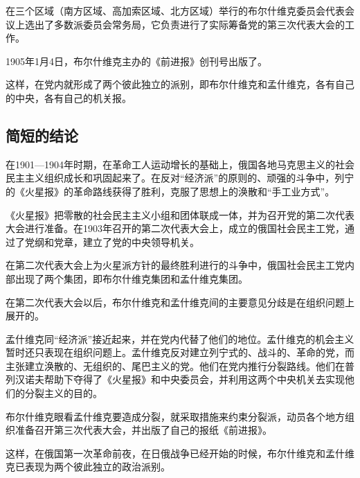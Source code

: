 在三个区域（南方区域、高加索区域、北方区域）举行的布尔什维克委员会代表会议上选出了多数派委员会常务局，它负责进行了实际筹备党的第三次代表大会的工作。

1905年1月4日，布尔什维克主办的《前进报》创刊号出版了。

这样，在党内就形成了两个彼此独立的派别，即布尔什维克和孟什维克，各有自己的中央，各有自己的机关报。


\subsection{简短的结论}

在1901—1904年时期，在革命工人运动增长的基础上，俄国各地马克思主义的社会民主主义组织成长和巩固起来了。在反对“经济派”的原则的、顽强的斗争中，列宁的《火星报》的革命路线获得了胜利，克服了思想上的涣散和“手工业方式”。

《火星报》把零散的社会民主主义小组和团体联成一体，并为召开党的第二次代表大会进行准备。在1903年召开的第二次代表大会上，成立的俄国社会民主工党，通过了党纲和党章，建立了党的中央领导机关。

在第二次代表大会上为火星派方针的最终胜利进行的斗争中，俄国社会民主工党内部出现了两个集团，即布尔什维克集团和孟什维克集团。

在第二次代表大会以后，布尔什维克和孟什维克间的主要意见分歧是在组织问题上展开的。

孟什维克同“经济派”接近起来，并在党内代替了他们的地位。孟什维克的机会主义暂时还只表现在组织问题上。孟什维克反对建立列宁式的、战斗的、革命的党，而主张建立涣散的、无组织的、尾巴主义的党。他们在党内推行分裂路线。他们在普列汉诺夫帮助下夺得了《火星报》和中央委员会，并利用这两个中央机关去实现他们的分裂主义的目的。

布尔什维克眼看孟什维克要造成分裂，就采取措施来约束分裂派，动员各个地方组织准备召开第三次代表大会，并出版了自己的报纸《前进报》。

这样，在俄国第一次革命前夜，在日俄战争已经开始的时候，布尔什维克和孟什维克已表现为两个彼此独立的政治派别。

